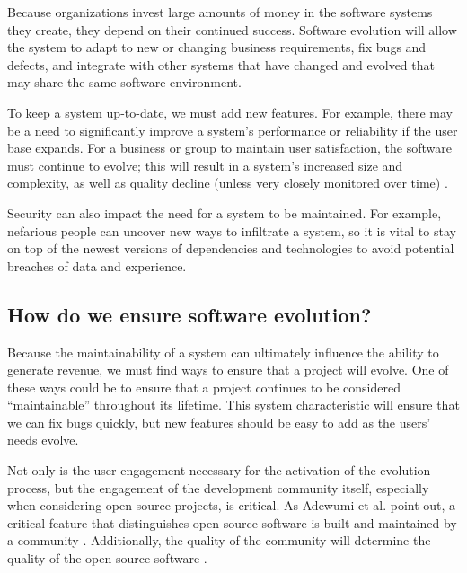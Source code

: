 Because organizations invest large amounts of money in the software systems they create, they depend on their continued success. Software evolution will allow the system to adapt to new or changing business requirements, fix bugs and defects, and integrate with other systems that have changed and evolved that may share the same software environment.

To keep a system up-to-date, we must add new features. For example, there may be a need to significantly improve a system's performance or reliability if the user base expands. For a business or group to maintain user satisfaction, the software must continue to evolve; this will result in a system's increased size and complexity, as well as quality decline (unless very closely monitored over time) \cite{yu:2013}.

Security can also impact the need for a system to be maintained. For example, nefarious people can uncover new ways to infiltrate a system, so it is vital to stay on top of the newest versions of dependencies and technologies to avoid potential breaches of data and experience.

\subsection{How do we ensure software evolution?} \label{subEnsureEvolution}

Because the maintainability of a system can ultimately influence the ability to generate revenue, we must find ways to ensure that a project will evolve. One of these ways could be to ensure that a project continues to be considered ``maintainable'' throughout its lifetime. This system characteristic will ensure that we can fix bugs quickly, but new features should be easy to add as the users' needs evolve.

Not only is the user engagement necessary for the activation of the evolution process, but the engagement of the development community itself, especially when considering open source projects, is critical. As Adewumi et al. point out, a critical feature that distinguishes open source software is built and maintained by a community \cite{haaland:2010}. Additionally, the quality of the community will determine the quality of the open-source software \cite{samoladas:2008}.
